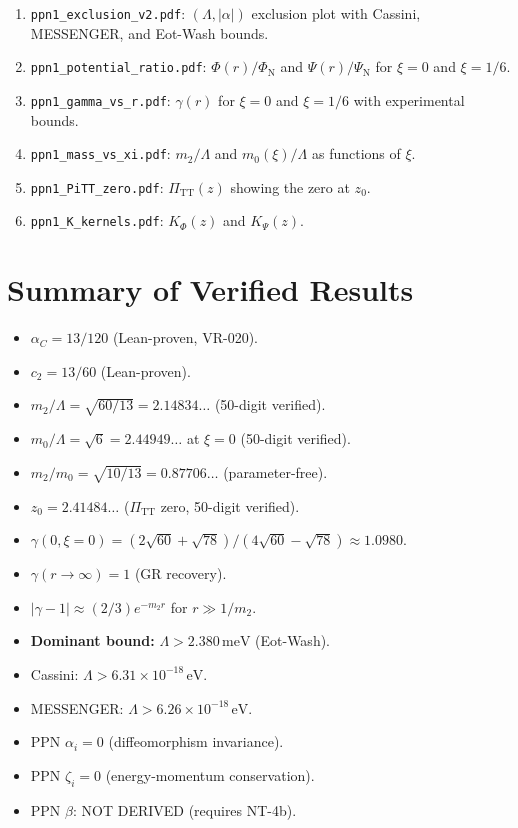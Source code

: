 \documentclass[11pt,a4paper]{article}
\newcommand{\PiTT}{\Pi_{\mathrm{TT}}}
\newcommand{\KPhi}{K_\Phi}
\newcommand{\KPsi}{K_\Psi}
\begin{document}
\begin{enumerate}
  \item \texttt{ppn1\_exclusion\_v2.pdf}: $(\Lambda, |\alpha|)$ exclusion
    plot with Cassini, MESSENGER, and Eot-Wash bounds.
  \item \texttt{ppn1\_potential\_ratio.pdf}: $\Phi(r)/\Phi_{\mathrm{N}}$
    and $\Psi(r)/\Psi_{\mathrm{N}}$ for $\xi = 0$ and $\xi = 1/6$.
  \item \texttt{ppn1\_gamma\_vs\_r.pdf}: $\gamma(r)$ for $\xi = 0$
    and $\xi = 1/6$ with experimental bounds.
  \item \texttt{ppn1\_mass\_vs\_xi.pdf}: $m_2/\Lambda$ and $m_0(\xi)/\Lambda$
    as functions of $\xi$.
  \item \texttt{ppn1\_PiTT\_zero.pdf}: $\PiTT(z)$ showing the zero at $z_0$.
  \item \texttt{ppn1\_K\_kernels.pdf}: $\KPhi(z)$ and $\KPsi(z)$.
\end{enumerate}


\section{Summary of Verified Results}
\label{sec:summary}

\begin{itemize}
  \item $\alpha_C = 13/120$ (Lean-proven, VR-020).
  \item $c_2 = 13/60$ (Lean-proven).
  \item $m_2/\Lambda = \sqrt{60/13} = 2.14834\ldots$ (50-digit verified).
  \item $m_0/\Lambda = \sqrt{6} = 2.44949\ldots$ at $\xi = 0$ (50-digit verified).
  \item $m_2/m_0 = \sqrt{10/13} = 0.87706\ldots$ (parameter-free).
  \item $z_0 = 2.41484\ldots$ ($\PiTT$ zero, 50-digit verified).
  \item $\gamma(0, \xi = 0) = (2\sqrt{60}+\sqrt{78})/(4\sqrt{60}-\sqrt{78}) \approx 1.0980$.
  \item $\gamma(r \to \infty) = 1$ (GR recovery).
  \item $|\gamma - 1| \approx (2/3)e^{-m_2 r}$ for $r \gg 1/m_2$.
  \item \textbf{Dominant bound:} $\Lambda > 2.380\,\mathrm{meV}$ (Eot-Wash).
  \item Cassini: $\Lambda > 6.31 \times 10^{-18}\,\mathrm{eV}$.
  \item MESSENGER: $\Lambda > 6.26 \times 10^{-18}\,\mathrm{eV}$.
  \item PPN $\alpha_i = 0$ (diffeomorphism invariance).
  \item PPN $\zeta_i = 0$ (energy-momentum conservation).
  \item PPN $\beta$: NOT DERIVED (requires NT-4b).
\end{itemize}
\end{document}
